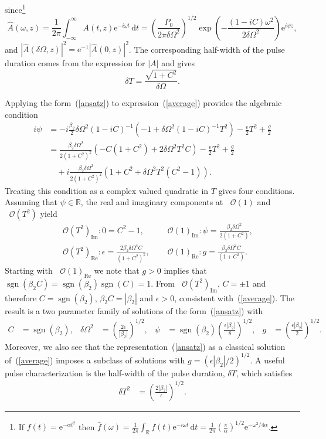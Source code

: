 \documentclass[12pt]{article}
\providecommand{\df}{\textrm{d}}
\providecommand{\bigO}[1]{\ensuremath{\mathop{}\mathopen{}\mathcal{O}\mathopen{}\left(#1\right)}}
\DeclareMathOperator{\sgn}{sgn}
\begin{document}
since\footnote{If $f(t) = \textrm{e}^{-\alpha t^2}$ then $\hat{f}(\omega) = \frac{1}{2\pi}\int_{\mathbb{R}}
f(t)\textrm{e}^{-i\omega t}\, \df t = \frac{1}{2\pi} (\frac{\pi}{\alpha})^{1/2}\textrm{e}^{-\omega^2/4\alpha}$.}
\[
	\hat{A}(\omega,z) = \frac{1}{2\pi}\int_{-\infty}^\infty A(t,z) \textrm{e}^{-i\omega t}\, \df t
	= \left(\frac{P_0}{2\pi\delta \Omega^2}\right)^{1/2}
	\exp\left(-\frac{(1-i C)\omega^2}{2\delta \Omega^2}\right) \textrm{e}^{i\psi z},
\]
and $|\hat{A}(\delta\Omega,z)|^2 = \textrm{e}^{-1}|\hat{A}(0,z)|^2$.  The corresponding half-width of the
pulse duration comes from the expression for $|A|$ and gives
\begin{equation}
\label{duration}
	\delta T = \frac{\sqrt{1+C^2}}{\delta \Omega}.
\end{equation}

Applying the form~(\ref{ansatz}) to expression~(\ref{average}) provides the algebraic condition
\begin{align*}
	i\psi &= -i\frac{\beta_2}{2}\delta\Omega^2(1-iC)^{-1}
	\left(-1 + \delta\Omega^2(1-iC)^{-1}T^2\right)-\frac{\epsilon}{2}T^2 + \frac{g}{2} \\
	&= \frac{\beta_2\delta\Omega^2}{2(1+C^2)^2}(-C(1+C^2)+2\delta\Omega^2 T^2C) -\frac{\epsilon}{2}T^2 + \frac{g}{2}\\
	& \quad + i\frac{\beta_2\delta\Omega^2}{2(1+C^2)^2}(1+C^2 + \delta\Omega^2 T^2(C^2-1)).
\end{align*}
Treating this condition as a complex valued quadratic in $T$ gives four conditions.  Assuming that $\psi\in\mathbb{R}$,
the real and imaginary components at $\bigO{1}$ and $\bigO{T^2}$ yield
\begin{align*}
	&\bigO{T^2}_{\textrm{Im}}: 0 = C^2 - 1, &
	&\bigO{1}_{\textrm{Im}}: \psi = \frac{\beta_2\delta\Omega^2}{2(1+C^2)}, \\
	&\bigO{T^2}_{\textrm{Re}}: \epsilon = \frac{2\beta_2\delta\Omega^4C}{(1+C^2)^2}, &
	&\bigO{1}_{\textrm{Re}}: g = \frac{\beta_2\delta\Omega^2C}{(1+C^2)}.
\end{align*}
Starting with $\bigO{1}_{\textrm{Re}}$ we note that $g > 0$ implies that 
$\sgn(\beta_2 C) = \sgn(\beta_2)\sgn(C) = 1$. 
From $\bigO{T^2}_{\textrm{Im}}$, $C = \pm 1$ and therefore $C = \sgn(\beta_2)$, 
$\beta_2 C = |\beta_2|$ and $\epsilon > 0$, consistent with~(\ref{average}).  
The result is a two parameter family of solutions
of the form~(\ref{ansatz}) with
\begin{align*}
	C &= \sgn(\beta_2),&
	\delta\Omega^2 &= \left(\frac{2\epsilon}{|\beta_2|}\right)^{1/2},&
	\psi &= \sgn(\beta_2)\left(\frac{\epsilon|\beta_2|}{8}\right)^{1/2},&
	g &= \left(\frac{\epsilon|\beta_2|}{2}\right)^{1/2}.
\end{align*}
Moreover, we also see that the representation~(\ref{ansatz})
as a classical solution of~(\ref{average}) imposes a subclass of solutions with 
$g = \left(\epsilon|\beta_2|/2\right)^{1/2}$.  
A useful pulse characterization is the half-width of the pulse duration, $\delta T$, which satisfies
\begin{align*}
	\delta T^2 &= \left(\frac{2|\beta_2|}{\epsilon}\right)^{1/2}.
\end{align*}
\end{document}
